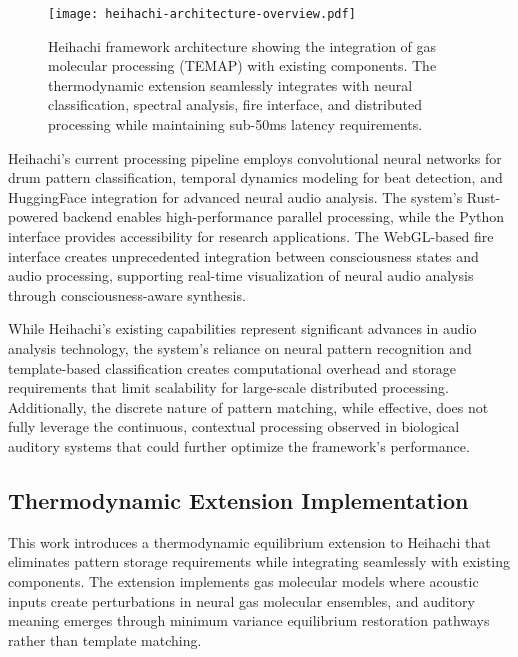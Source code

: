 \documentclass[12pt,a4paper]{article}
\begin{document}
\begin{figure}[h]
\centering
\texttt{[image: heihachi-architecture-overview.pdf]}
\caption{Heihachi framework architecture showing the integration of gas molecular processing (TEMAP) with existing components. The thermodynamic extension seamlessly integrates with neural classification, spectral analysis, fire interface, and distributed processing while maintaining sub-50ms latency requirements.}
\label{fig:heihachi_architecture}
\end{figure}

Heihachi's current processing pipeline employs convolutional neural networks for drum pattern classification, temporal dynamics modeling for beat detection, and HuggingFace integration for advanced neural audio analysis. The system's Rust-powered backend enables high-performance parallel processing, while the Python interface provides accessibility for research applications. The WebGL-based fire interface creates unprecedented integration between consciousness states and audio processing, supporting real-time visualization of neural audio analysis through consciousness-aware synthesis.

While Heihachi's existing capabilities represent significant advances in audio analysis technology, the system's reliance on neural pattern recognition and template-based classification creates computational overhead and storage requirements that limit scalability for large-scale distributed processing. Additionally, the discrete nature of pattern matching, while effective, does not fully leverage the continuous, contextual processing observed in biological auditory systems that could further optimize the framework's performance.

\subsection{Thermodynamic Extension Implementation}

This work introduces a thermodynamic equilibrium extension to Heihachi that eliminates pattern storage requirements while integrating seamlessly with existing components. The extension implements gas molecular models where acoustic inputs create perturbations in neural gas molecular ensembles, and auditory meaning emerges through minimum variance equilibrium restoration pathways rather than template matching.
\end{document}
